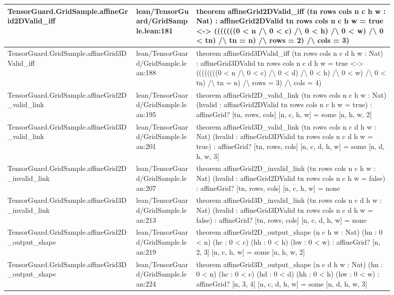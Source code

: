 \documentclass[10pt]{article}
\begin{document}
\begin{longtable}{|p{0.30\linewidth}|p{0.14\linewidth}|p{0.46\linewidth}|}
\hline
TensorGuard.GridSample.affineGrid2DValid\_iff & lean/TensorGuard/GridSample.lean:181 & theorem affineGrid2DValid\_iff (tn rows cols n c h w : Nat) : affineGrid2DValid tn rows cols n c h w = true <-> (((((((0 < n /\textbackslash{} 0 < c) /\textbackslash{} 0 < h) /\textbackslash{} 0 < w) /\textbackslash{} 0 < tn) /\textbackslash{} tn = n) /\textbackslash{} rows = 2) /\textbackslash{} cols = 3) \\
\hline
TensorGuard.GridSample.affineGrid3DValid\_iff & lean/TensorGuard/GridSample.lean:188 & theorem affineGrid3DValid\_iff (tn rows cols n c d h w : Nat) : affineGrid3DValid tn rows cols n c d h w = true <-> ((((((((0 < n /\textbackslash{} 0 < c) /\textbackslash{} 0 < d) /\textbackslash{} 0 < h) /\textbackslash{} 0 < w) /\textbackslash{} 0 < tn) /\textbackslash{} tn = n) /\textbackslash{} rows = 3) /\textbackslash{} cols = 4) \\
\hline
TensorGuard.GridSample.affineGrid2D\_valid\_link & lean/TensorGuard/GridSample.lean:195 & theorem affineGrid2D\_valid\_link (tn rows cols n c h w : Nat) (hvalid : affineGrid2DValid tn rows cols n c h w = true) : affineGrid? [tn, rows, cols] [n, c, h, w] = some [n, h, w, 2] \\
\hline
TensorGuard.GridSample.affineGrid3D\_valid\_link & lean/TensorGuard/GridSample.lean:201 & theorem affineGrid3D\_valid\_link (tn rows cols n c d h w : Nat) (hvalid : affineGrid3DValid tn rows cols n c d h w = true) : affineGrid? [tn, rows, cols] [n, c, d, h, w] = some [n, d, h, w, 3] \\
\hline
TensorGuard.GridSample.affineGrid2D\_invalid\_link & lean/TensorGuard/GridSample.lean:207 & theorem affineGrid2D\_invalid\_link (tn rows cols n c h w : Nat) (hvalid : affineGrid2DValid tn rows cols n c h w = false) : affineGrid? [tn, rows, cols] [n, c, h, w] = none \\
\hline
TensorGuard.GridSample.affineGrid3D\_invalid\_link & lean/TensorGuard/GridSample.lean:213 & theorem affineGrid3D\_invalid\_link (tn rows cols n c d h w : Nat) (hvalid : affineGrid3DValid tn rows cols n c d h w = false) : affineGrid? [tn, rows, cols] [n, c, d, h, w] = none \\
\hline
TensorGuard.GridSample.affineGrid2D\_output\_shape & lean/TensorGuard/GridSample.lean:219 & theorem affineGrid2D\_output\_shape (n c h w : Nat) (hn : 0 < n) (hc : 0 < c) (hh : 0 < h) (hw : 0 < w) : affineGrid? [n, 2, 3] [n, c, h, w] = some [n, h, w, 2] \\
\hline
TensorGuard.GridSample.affineGrid3D\_output\_shape & lean/TensorGuard/GridSample.lean:224 & theorem affineGrid3D\_output\_shape (n c d h w : Nat) (hn : 0 < n) (hc : 0 < c) (hd : 0 < d) (hh : 0 < h) (hw : 0 < w) : affineGrid? [n, 3, 4] [n, c, d, h, w] = some [n, d, h, w, 3] \\

\end{longtable}
\end{document}
